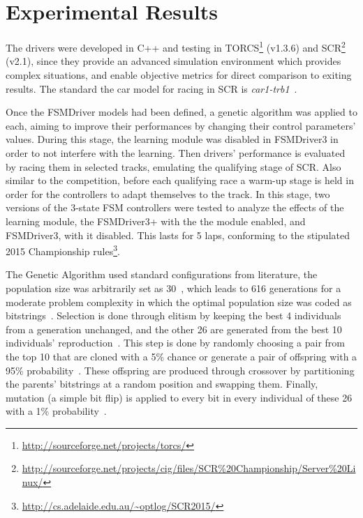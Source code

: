 \section{Experimental Results}\label{sec:4}%
\newcommand{\car}[1]{\emph{#1}}%

The drivers were developed in C++ and testing in TORCS\footnote{\url{http://sourceforge.net/projects/torcs/}} (v1.3.6) and SCR\footnote{\url{http://sourceforge.net/projects/cig/files/SCR\%20Championship/Server\%20Linux/}} (v2.1), since they provide an advanced simulation environment which provides complex situations, and enable objective metrics for direct comparison to exiting results. The standard the car model for racing in SCR is \car{car1-trb1}~\cite{SCR}.


Once the FSMDriver models had been defined, a genetic algorithm was applied to each, aiming to improve their performances by changing their control parameters' values. During this stage, the learning module was disabled in FSMDriver3 in order to not interfere with the learning. Then drivers' performance is evaluated by racing them in selected tracks, emulating the qualifying stage of SCR. Also similar to the competition, before each qualifying race a warm-up stage is held in order for the controllers to adapt themselves to the track. In this stage, two versions of the 3-state FSM controllers were tested to analyze the effects of the learning module, the FSMDriver3+ with the the module enabled, and FSMDriver3, with it disabled. This lasts for 5 laps, conforming to the stipulated 2015 Championship rules\footnote{\url{http://cs.adelaide.edu.au/~optlog/SCR2015/}}.

The Genetic Algorithm used standard configurations from literature, the population size was arbitrarily set as 30~\cite{RATES}, which leads to 616 generations for a moderate problem complexity in which the optimal population size was coded as bitstrings~\cite{218485}. Selection is done through elitism by keeping the best 4 individuals from a generation unchanged, and the other 26 are generated from the best 10 individuals' reproduction~\cite{ELITISM}. This step is done by randomly choosing a pair from the top 10 that are cloned with a 5\% chance or generate a pair of offspring with a 95\% probability~\cite{RATES}. These offspring are produced through crossover by partitioning the parents' bitstrings at a random position and swapping them. Finally, mutation (a simple bit flip) is applied to every bit in every individual of these 26 with a 1\% probability~\cite{RATES}.

